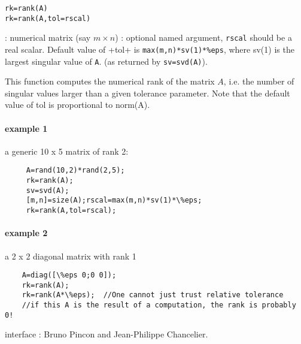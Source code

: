 
\begin{mandesc}
\end{mandesc}

\begin{calling_sequence}
\begin{verbatim}
rk=rank(A)
rk=rank(A,tol=rscal)
\end{verbatim}
\end{calling_sequence}
\begin{parameters}
  \begin{varlist}
    :  numerical matrix (say $m \times n$)
    : optional named argument, \verb+rscal+ should be a real scalar. Default value of \ver+tol+ is \verb+max(m,n)*sv(1)*%eps+, where sv(1) is the largest singular value of \verb+A+. (as returned by \verb+sv=svd(A)+).
  \end{varlist}
\end{parameters}

\begin{mandescription}
This function computes the numerical rank of the matrix $A$, i.e. the number
of singular values larger than a given tolerance parameter. Note that the 
default value of tol is proportional to norm(A).
\end{mandescription}

\begin{examples}
\paragraph{example 1} a generic 10 x 5 matrix of rank 2:
  \begin{Verbatim}
     A=rand(10,2)*rand(2,5);
     rk=rank(A);
     sv=svd(A);
     [m,n]=size(A);rscal=max(m,n)*sv(1)*\%eps;
     rk=rank(A,tol=rscal);
  \end{Verbatim}
\paragraph{example 2} a 2 x 2 diagonal matrix with rank 1
  \begin{Verbatim}
    A=diag([\%eps 0;0 0]);
    rk=rank(A);
    rk=rank(A*\%eps);  //One cannot just trust relative tolerance
    //if this A is the result of a computation, the rank is probably 0! 
  \end{Verbatim}

\end{examples}

\begin{manseealso}
\end{manseealso}

\begin{authors}
   interface : Bruno Pincon and Jean-Philippe Chancelier. 
\end{authors}
